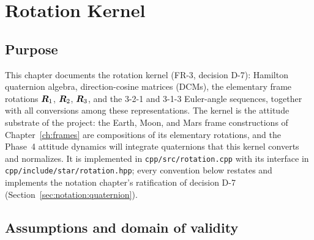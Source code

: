 \chapter{Rotation Kernel}
\label{ch:rotations}

\section{Purpose}
\label{sec:rotations:purpose}

This chapter documents the rotation kernel (FR-3, decision D-7): Hamilton
quaternion algebra, direction-cosine matrices (DCMs), the elementary frame
rotations $\bm{R}_1$, $\bm{R}_2$, $\bm{R}_3$, and the 3-2-1 and 3-1-3
Euler-angle sequences, together with all conversions among these
representations. The kernel is the attitude substrate of the project: the
Earth, Moon, and Mars frame constructions of Chapter~\ref{ch:frames} are
compositions of its elementary rotations, and the Phase~4 attitude dynamics
will integrate quaternions that this kernel converts and normalizes. It is
implemented in \texttt{cpp/src/rotation.cpp} with its interface in
\texttt{cpp/include/star/rotation.hpp}; every convention below restates and
implements the notation chapter's ratification of decision D-7
(Section~\ref{sec:notation:quaternion}).

\section{Assumptions and domain of validity}
\label{sec:rotations:domain}

